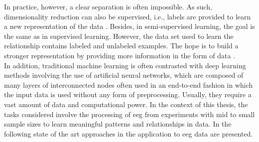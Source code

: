 \noindent In practice, however, a clear separation is often impossible. As such, dimensionality reduction can also be supervised, i.e., labels are provided to learn a new representation of the data \cite{Mcinnes2018}. Besides, in semi-supervised learning, the goal is the same as in supervised learning. However, the data set used to learn the relationship contains labeled and unlabeled examples. The hope is to build a stronger representation by providing more information in the form of data \cite{Burkov2019}. \\
In addition, traditional machine learning is often contrasted with deep learning methods involving the use of artificial neural networks, which are composed of many layers of interconnected nodes often used in an end-to-end fashion in which the input data is used without any form of preprocessing. Usually, they require a vast amount of data and computational power. In the context of this thesis, the tasks considered involve the processing of \gls{eeg} from experiments with mid to small sample sizes to learn meaningful patterns and relationships in data. In the following state of the art approaches in the application to \gls{eeg} data are presented.

